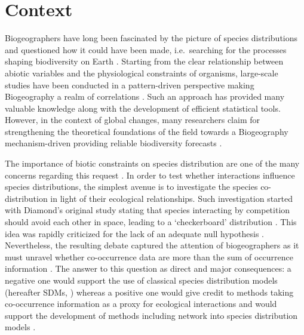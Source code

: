 \section{Context}\label{context}

Biogeographers have long been fascinated by the picture of species
distributions and questioned how it could have been made, i.e.~searching
for the processes shaping biodiversity on Earth
\citep[\citet{Tittensor_2010}]{Engelbrecht_2007}. Starting from the
clear relationship between abiotic variables and the physiological
constraints of organisms, large-scale studies have been conducted in a
pattern-driven perspective making Biogeography a realm of correlations
\citep{Gaston_2000}. Such an approach has provided many valuable
knowledge along with the development of efficient statistical tools.
However, in the context of global changes, many researchers claim for
strengthening the theoretical foundations of the field towards a
Biogeography mechanism-driven providing reliable biodiversity forecasts
\citep[\citet{Thuiller_2013}, \citet{Violle_2014}]{Lomolino_2000}.

The importance of biotic constraints on species distribution are one of
the many concerns regarding this request
\citep[\citet{Araujo2014}]{Godsoe_2012}. In order to test whether
interactions influence species distributions, the simplest avenue is to
investigate the species co-distribution in light of their ecological
relationships. Such investigation started with Diamond's original study
stating that species interacting by competition should avoid each other
in space, leading to a `checkerboard' distribution \citep{Diamond1975}.
This idea was rapidly criticized for the lack of an adequate null
hypothesis \citep[\citet{Gilpin_1982}]{Connor_1979}. Nevertheless, the
resulting debate captured the attention of biogeographers as it must
unravel whether co-occurrence data are more than the sum of occurrence
information \citep{Clark_2014}. The answer to this question as direct
and major consequences: a negative one would support the use of
classical species distribution models (hereafter SDMs,
\citet{Elith_2009}) whereas a positive one would give credit to methods
taking co-occurrence information as a proxy for ecological interactions
\citep{Morales_Castilla_2015} and would support the development of
methods including network into species distribution models
\citep[\citet{Pollock_2014}]{Ovaskainen_2010}.

